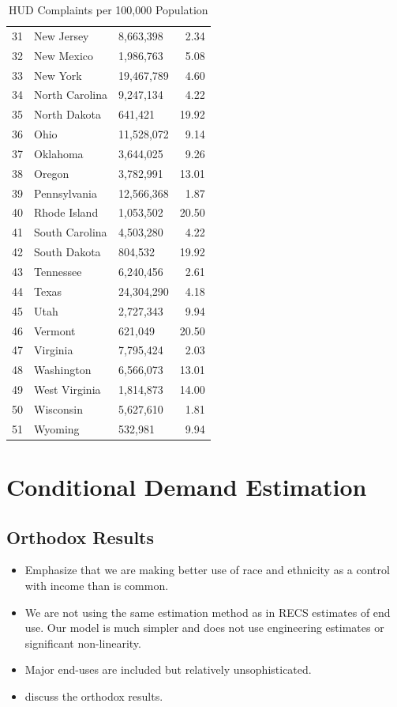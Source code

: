 \documentclass{article}
\begin{document}
\begin{table}[ht]
\begin{tabular}{rllr}
  31 & New Jersey & 8,663,398 & 2.34 \\ 
  32 & New Mexico & 1,986,763 & 5.08 \\ 
  33 & New York & 19,467,789 & 4.60 \\ 
  34 & North Carolina & 9,247,134 & 4.22 \\ 
  35 & North Dakota & 641,421 & 19.92 \\ 
  36 & Ohio & 11,528,072 & 9.14 \\ 
  37 & Oklahoma & 3,644,025 & 9.26 \\ 
  38 & Oregon & 3,782,991 & 13.01 \\ 
  39 & Pennsylvania & 12,566,368 & 1.87 \\ 
  40 & Rhode Island & 1,053,502 & 20.50 \\ 
  41 & South Carolina & 4,503,280 & 4.22 \\ 
  42 & South Dakota & 804,532 & 19.92 \\ 
  43 & Tennessee & 6,240,456 & 2.61 \\ 
  44 & Texas & 24,304,290 & 4.18 \\ 
  45 & Utah & 2,727,343 & 9.94 \\ 
  46 & Vermont & 621,049 & 20.50 \\ 
  47 & Virginia & 7,795,424 & 2.03 \\ 
  48 & Washington & 6,566,073 & 13.01 \\ 
  49 & West Virginia & 1,814,873 & 14.00 \\ 
  50 & Wisconsin & 5,627,610 & 1.81 \\ 
  51 & Wyoming & 532,981 & 9.94 \\ 
   \hline
\end{tabular}
\caption{HUD Complaints per 100,000 Population} 
\label{tab:HUDComplaints}
\end{table}
\section{Conditional Demand Estimation}

  \subsection{Orthodox Results}
  
  \begin{itemize}
    \item Emphasize that we are making better use of race and ethnicity as a control with income than is common.
    \item We are not using the same estimation method as in RECS estimates of end use.  Our model is much simpler and does not use engineering estimates or significant non-linearity.
    \item Major end-uses are included but relatively unsophisticated.
    \item discuss the orthodox results.
  \end{itemize}
  
\end{document}
